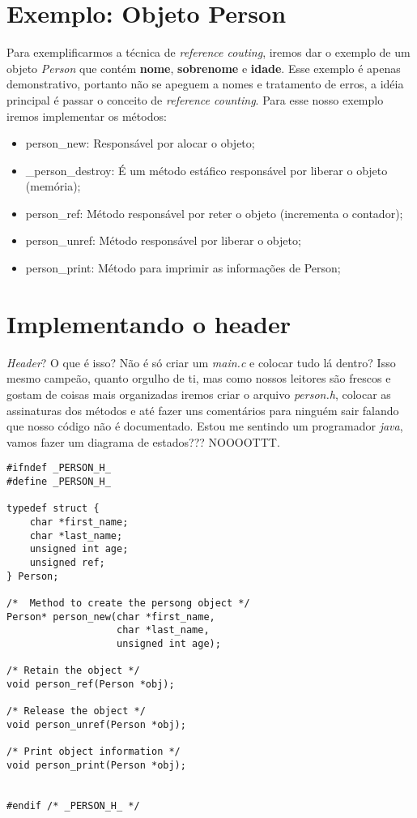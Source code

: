 \section{Exemplo: Objeto Person}

Para exemplificarmos a técnica de \textit{reference couting}, iremos dar o exemplo de um objeto \textit{Person} que contém \textbf{nome}, \textbf{sobrenome} e \textbf{idade}. 
Esse exemplo é apenas demonstrativo, portanto não se apeguem a nomes e tratamento de erros, a idéia principal é passar o conceito 
de \textit{reference counting}. Para esse nosso exemplo iremos implementar os métodos:
\vspace{5 mm}
\begin{itemize}
  \item person\_new: Responsável por alocar o objeto;
  \item \_person\_destroy: É um método estáfico responsável por liberar o objeto (memória);
  \item person\_ref: Método responsável por reter o objeto (incrementa o contador);
  \item person\_unref: Método responsável por liberar o objeto;
  \item person\_print: Método para imprimir as informações de Person;
\end{itemize}

\section{Implementando o header}

\textit{Header}? O que é isso? Não é só criar um \textit{main.c} e colocar tudo lá dentro? Isso mesmo campeão, quanto orgulho de ti, mas como nossos leitores são 
frescos e gostam de coisas mais organizadas iremos criar o arquivo \textit{person.h}, colocar as assinaturas dos métodos e até fazer 
uns comentários para ninguém sair falando que nosso código não é documentado. Estou me sentindo um programador \textit{java}, vamos 
fazer um diagrama de estados??? NOOOOTTT.

\belowcaptionskip=-10pt
\begin{lstlisting}[label=some-code,caption=person.h]
#ifndef _PERSON_H_
#define _PERSON_H_

typedef struct {
    char *first_name;
    char *last_name;
    unsigned int age;
    unsigned ref;
} Person;

/*  Method to create the persong object */
Person* person_new(char *first_name,
                   char *last_name,
                   unsigned int age);

/* Retain the object */
void person_ref(Person *obj);

/* Release the object */
void person_unref(Person *obj);

/* Print object information */
void person_print(Person *obj);


#endif /* _PERSON_H_ */
\end{lstlisting}

